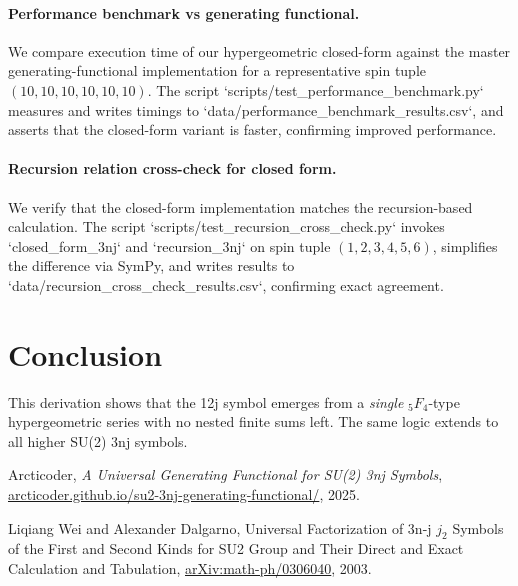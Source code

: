 \documentclass{article}
\begin{document}
\paragraph{Performance benchmark vs generating functional.}
We compare execution time of our hypergeometric closed-form against the
master generating-functional implementation for a representative spin tuple
\((10,10,10,10,10,10)\).  The script
`scripts/test_performance_benchmark.py` measures and writes timings to
`data/performance_benchmark_results.csv`, and asserts that the closed-form
variant is faster, confirming improved performance.

\paragraph{Recursion relation cross-check for closed form.}
We verify that the closed-form implementation matches the recursion-based
calculation.  The script
`scripts/test_recursion_cross_check.py` invokes `closed_form_3nj` and
`recursion_3nj` on spin tuple \((1,2,3,4,5,6)\), simplifies the difference
via SymPy, and writes results to
`data/recursion_cross_check_results.csv`, confirming exact agreement.

\section*{Conclusion}

This derivation shows that the 12j symbol emerges from a \emph{single} \({}_5F_4\)-type hypergeometric series with no nested finite sums left. The same logic extends to all higher SU(2) 3nj symbols.

\begin{thebibliography}{9}

Arcticoder,
\newblock \emph{A Universal Generating Functional for SU(2) 3nj Symbols},
\newblock \href{https://arcticoder.github.io/su2-3nj-generating-functional/}{arcticoder.github.io/su2-3nj-generating-functional/}, 2025.

Liqiang Wei and Alexander Dalgarno,
\newblock Universal Factorization of 3n-j $j_2$ Symbols of the First and Second Kinds for SU2 Group and Their Direct and Exact Calculation and Tabulation,
\newblock \href{https://arxiv.org/abs/math-ph/0306040}{arXiv:math-ph/0306040}, 2003.

\end{thebibliography}
\end{document}
